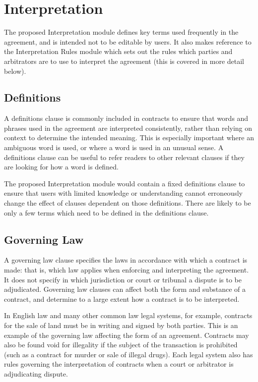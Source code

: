 \documentclass[a4paper,12pt]{article}
\begin{document}
\section{Interpretation}

The proposed Interpretation module defines key terms used frequently in the agreement, and is intended not to be editable by users. It also makes reference to the Interpretation Rules module which sets out the rules which parties and arbitrators are to use to interpret the agreement (this is covered in more detail below).

\subsection{Definitions}

A definitions clause is commonly included in contracts to ensure that words and phrases used in the agreement are interpreted consistently, rather than relying on context to determine the intended meaning. This is especially important where an ambiguous word is used, or where a word is used in an unusual sense. A definitions clause can be useful to refer readers to other relevant clauses if they are looking for how a word is defined.

The proposed Interpretation module would contain a fixed definitions clause to ensure that users with limited knowledge or understanding cannot erroneously change the effect of clauses dependent on those definitions. There are likely to be only a few terms which need to be defined in the definitions clause.

\subsection{Governing Law}

A governing law clause specifies the laws in accordance with which a contract is made: that is, which law applies when enforcing and interpreting the agreement. It does not specify in which jurisdiction or court or tribunal a dispute is to be adjudicated. Governing law clauses can affect both the form and substance of a contract, and determine to a large extent how a contract is to be interpreted.

In English law and many other common law legal systems, for example, contracts for the sale of land must be in writing and signed by both parties. This is an example of the governing law affecting the form of an agreement. Contracts may also be found void for illegality if the subject of the transaction is prohibited (such as a contract for murder or sale of illegal drugs). Each legal system also has rules governing the interpretation of contracts when a court or arbitrator is adjudicating dispute.
\end{document}
